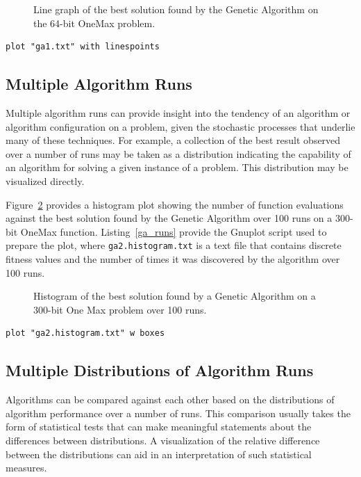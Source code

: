 \documentclass[a4paper, 11pt]{article}
\begin{document}
\begin{figure}[htp]
\centering

\caption{Line graph of the best solution found by the Genetic Algorithm on the 64-bit OneMax problem.}
\label{plot:ga1}
\end{figure}

\begin{lstlisting}[caption=Gnuplot script for creating a line graph of algorithm performance over time., label=ga_performance]
plot "ga1.txt" with linespoints
\end{lstlisting}

\subsection{Multiple Algorithm Runs}
Multiple algorithm runs can provide insight into the tendency of an algorithm or algorithm configuration on a problem, given the stochastic processes that underlie many of these techniques. For example, a collection of the best result observed over a number of runs may be taken as a distribution indicating the capability of an algorithm for solving a given instance of a problem. This distribution may be visualized directly. 

Figure~\ref{plot:ga2} provides a histogram plot showing the number of function evaluations against the best solution found by the Genetic Algorithm over 100 runs on a 300-bit OneMax function. Listing~\ref{ga_runs} provide the Gnuplot script used to prepare the plot, where \texttt{ga2.histogram.txt} is a text file that contains discrete fitness values and the number of times it was discovered by the algorithm over 100 runs.

\begin{figure}[htp]
\centering

\caption{Histogram of the best solution found by a Genetic Algorithm on a 300-bit One Max problem over 100 runs.}
\label{plot:ga2}
\end{figure}

\begin{lstlisting}[caption=Gnuplot script for creating a histogram of algorithm performance from multiple runs., label=ga_runs]
plot "ga2.histogram.txt" w boxes
\end{lstlisting}

\subsection{Multiple Distributions of Algorithm Runs}
Algorithms can be compared against each other based on the distributions of algorithm performance over a number of runs. This comparison usually takes the form of statistical tests that can make meaningful statements about the differences between distributions. A visualization of the relative difference between the distributions can aid in an interpretation of such statistical measures. 
\end{document}
